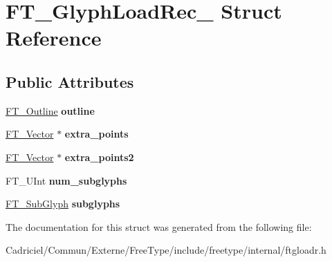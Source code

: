 \hypertarget{struct_f_t___glyph_load_rec__}{\section{F\-T\-\_\-\-Glyph\-Load\-Rec\-\_\- Struct Reference}
\label{struct_f_t___glyph_load_rec__}
}
\subsection*{Public Attributes}
\begin{DoxyCompactItemize}
\item 
\hypertarget{struct_f_t___glyph_load_rec___ae340cdb5263322e86c640b15f82ea72a}{\hyperlink{struct_f_t___outline__}{F\-T\-\_\-\-Outline} {\bfseries outline}}\label{struct_f_t___glyph_load_rec___ae340cdb5263322e86c640b15f82ea72a}

\item 
\hypertarget{struct_f_t___glyph_load_rec___ad2547bd6a7c7473d3a4646dfe908f1c3}{\hyperlink{struct_f_t___vector__}{F\-T\-\_\-\-Vector} $\ast$ {\bfseries extra\-\_\-points}}\label{struct_f_t___glyph_load_rec___ad2547bd6a7c7473d3a4646dfe908f1c3}

\item 
\hypertarget{struct_f_t___glyph_load_rec___a5e8bbe62bd889e806700bc0d583ff79b}{\hyperlink{struct_f_t___vector__}{F\-T\-\_\-\-Vector} $\ast$ {\bfseries extra\-\_\-points2}}\label{struct_f_t___glyph_load_rec___a5e8bbe62bd889e806700bc0d583ff79b}

\item 
\hypertarget{struct_f_t___glyph_load_rec___a71dc4ab52b956b974fe65c95a098e03c}{F\-T\-\_\-\-U\-Int {\bfseries num\-\_\-subglyphs}}\label{struct_f_t___glyph_load_rec___a71dc4ab52b956b974fe65c95a098e03c}

\item 
\hypertarget{struct_f_t___glyph_load_rec___a12ef145fedbeb14cc8b9d320ae3fed96}{\hyperlink{struct_f_t___sub_glyph_rec__}{F\-T\-\_\-\-Sub\-Glyph} {\bfseries subglyphs}}\label{struct_f_t___glyph_load_rec___a12ef145fedbeb14cc8b9d320ae3fed96}

\end{DoxyCompactItemize}


The documentation for this struct was generated from the following file\-:\begin{DoxyCompactItemize}
\item 
Cadriciel/\-Commun/\-Externe/\-Free\-Type/include/freetype/internal/ftgloadr.\-h\end{DoxyCompactItemize}
